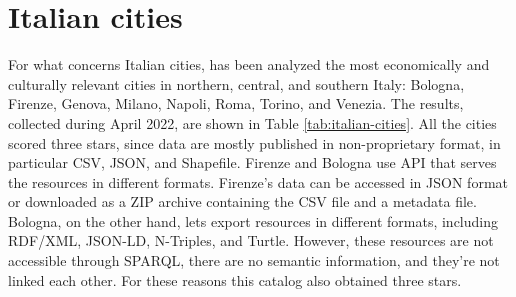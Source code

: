 \section{Italian cities}
\label{sec:italian-cities}

For what concerns Italian cities, has been analyzed the most economically and culturally relevant cities in northern, central, and southern Italy: Bologna, Firenze, Genova, Milano, Napoli, Roma, Torino, and Venezia. The results, collected during April 2022, are shown in Table \ref{tab:italian-cities}. All the cities scored three stars, since data are mostly published in non-proprietary format, in particular \ac{CSV}, \ac{JSON}, and Shapefile. Firenze and Bologna use \acs{API} that serves the resources in different formats. Firenze's data can be accessed in \acs{JSON} format or downloaded as a ZIP archive containing the \ac{CSV} file and a metadata file. Bologna, on the other hand, lets export resources in different formats, including \ac{RDF}/\ac{XML}, \ac{JSON}-LD, N-Triples, and Turtle. However, these resources are not accessible through \ac{SPARQL}, there are no semantic information, and they're not linked each other. For these reasons this catalog also obtained three stars.


